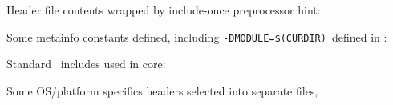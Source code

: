 \label{headers}\secdown

Header file contents wrapped by include-once preprocessor hint:


Some metainfo constants defined, including
\verb|-DMODULE=$(CURDIR)|\ defined in :


Standard \cpp\ includes used in core: 



Some OS/platform specifics headers selected into separate files,


\secup
